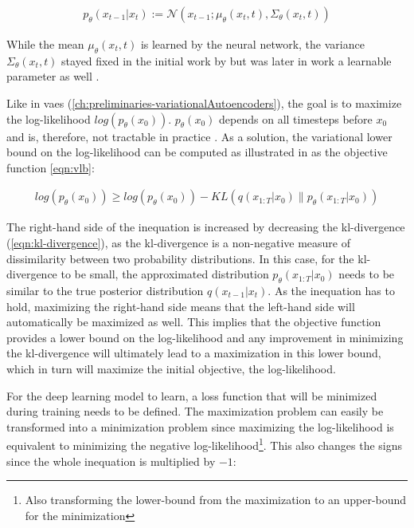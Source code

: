 \begin{equation}
  \label{eqn:reverse_2}
  \begin{align*}
    p_{\theta}(x_{t-1}|x_t) := \mathcal{N}(x_{t-1}; \mu_{\theta}(x_t, t), \Sigma_{\theta}(x_t, t))
  \end{align*}
\end{equation}
    
While the mean $\mu_{\theta}(x_t, t)$ is learned by the neural network, the variance $\Sigma_{\theta}(x_t, t)$ stayed fixed in the initial work by \cite{ho2020DenoisingDiffusionProbabilistic} 
but was later in \textcite{nichol2021ImprovedDenoisingDiffusion} work a learnable parameter as well \cite{zbinden2022ImplementingExperimentingDiffusion}.

Like in \glspl{vae} (\autoref{ch:preliminaries-variationalAutoencoders}), the goal is to maximize the log-likelihood $log(p_\theta(x_0))$.
$p_\theta(x_0)$ depends on all timesteps before $x_0$ and is, therefore, not tractable in practice \cite{zbinden2022ImplementingExperimentingDiffusion}.
As a solution, the variational lower bound on the log-likelihood can be computed as illustrated in as the objective function \autoref{eqn:vlb}: %

\begin{equation}
  \label{eqn:vlb}
  \begin{align*}
    log(p_\theta(x_0)) \geq log(p_\theta(x_0)) - KL(q(x_{1:T}|x_0) \parallel p_\theta(x_{1:T}|x_0))
  \end{align*}
\end{equation}

The right-hand side of the inequation is increased by decreasing the \gls{kl}-divergence (\autoref{eqn:kl-divergence}), as the \gls{kl}-divergence is a non-negative measure of dissimilarity between two probability distributions. 
In this case, for the \gls{kl}-divergence to be small, the approximated distribution $p_\theta(x_{1:T}|x_0)$ needs to be similar to the true posterior distribution $q(x_{t-1}|x_t)$.
As the inequation has to hold, maximizing the right-hand side means that the left-hand side will automatically be maximized as well.
This implies that the objective function provides a lower bound on the log-likelihood and any improvement in minimizing the \gls{kl}-divergence will ultimately lead to a maximization in this lower bound, which in turn will maximize the initial objective, the log-likelihood.

For the deep learning model to learn, a loss function that will be minimized during training needs to be defined.
The maximization problem can easily be transformed into a minimization problem since maximizing the log-likelihood is equivalent to minimizing the negative log-likelihood\footnote{Also transforming the lower-bound from the maximization to an upper-bound for the minimization}.
This also changes the signs since the whole inequation is multiplied by $-1$:

